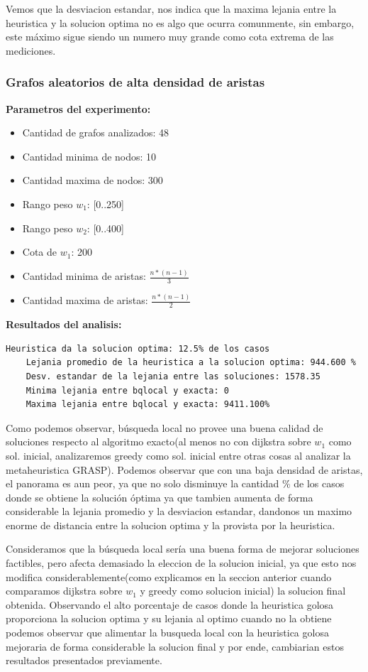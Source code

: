 Vemos que la desviacion estandar, nos indica que la maxima lejania entre la heuristica y la solucion optima no es algo que ocurra comunmente, sin embargo, este m\'aximo sigue siendo un numero muy grande como cota extrema de las mediciones.

\subsubsection{Grafos aleatorios de alta densidad de aristas}
\textbf{Parametros del experimento:}
\begin{itemize}
	\item Cantidad de grafos analizados: 48
	\item Cantidad minima de nodos: 10
	\item Cantidad maxima de nodos: 300
	\item Rango peso $w_1$: [0..250]
	\item Rango peso $w_2$: [0..400]
	\item Cota de $w_1$: 200
	\item Cantidad minima de aristas: $\frac{n * (n-1)}{3}$
	\item Cantidad maxima de aristas: $\frac{n * (n-1)}{2}$
\end{itemize}

\textbf{Resultados del analisis:}
\begin{lstlisting}[frame=single]	
	Heuristica da la solucion optima: 12.5% de los casos
	Lejania promedio de la heuristica a la solucion optima: 944.600 %
	Desv. estandar de la lejania entre las soluciones: 1578.35
	Minima lejania entre bqlocal y exacta: 0
	Maxima lejania entre bqlocal y exacta: 9411.100%
\end{lstlisting}

Como podemos observar, b\'usqueda local no provee una buena calidad de soluciones respecto al algoritmo exacto(al menos no con dijkstra sobre $w_1$ como sol. inicial, analizaremos greedy como sol. inicial entre otras cosas al analizar la metaheuristica GRASP). Podemos observar que con una baja densidad de aristas, el panorama es aun peor, ya que no solo disminuye la cantidad \% de los casos donde se obtiene la soluci\'on \'optima ya que tambien aumenta de forma considerable la lejania promedio y la desviacion estandar, dandonos un maximo enorme de distancia entre la solucion optima y la provista por la heuristica.

Consideramos que la b\'usqueda local ser\'ia una buena forma de mejorar soluciones factibles, pero afecta demasiado la eleccion de la solucion inicial, ya que esto nos modifica considerablemente(como explicamos en la seccion anterior cuando comparamos dijkstra sobre $w_1$ y greedy como solucion inicial) la solucion final obtenida.
Observando el alto porcentaje de casos donde la heuristica golosa proporciona la solucion optima y su lejania al optimo cuando no la obtiene podemos observar que alimentar la busqueda local con la heuristica golosa mejoraria de forma considerable la solucion final y por ende, cambiarian estos resultados presentados previamente.